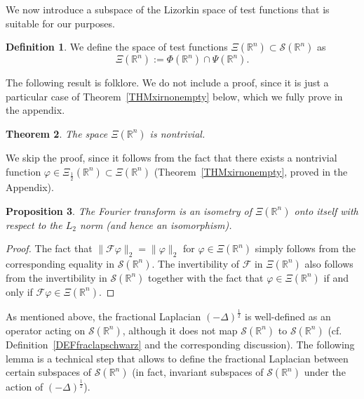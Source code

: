 \documentclass[reqno,11pt]{amsart}
\newtheorem{theorem}{Theorem}[section]
\newtheorem{proposition}[theorem]{Proposition}
\theoremstyle{definition}
\newtheorem{definition}[theorem]{Definition}
\def\R{\mathbb{R}}
\begin{document}
We now introduce a subspace of the Lizorkin space of test functions that is suitable for our purposes.
\begin{definition}
\label{space0}
	We define the space of test functions $\Xi(\R^n)\subset \mathcal{S}(\R^n)$ as \[
	\Xi(\R^n):=\Phi(\R^n)\cap \Psi(\R^n).
	\]
\end{definition}

The following result is folklore. We do not include a proof, since it is just a particular case of Theorem~\ref{THMxirnonempty} below, which we fully prove in the appendix.

\begin{theorem}
	The space $\Xi(\R^n)$ is nontrivial.
\end{theorem}
We skip the proof, since it follows from the fact that there exists a nontrivial function $\varphi\in \Xi_{\frac{1}{2}}(\R^n)\subset \Xi(\R^n)$ (Theorem~\ref{THMxirnonempty}, proved in the Appendix).



\begin{proposition}\label{PROPinvertibility}
	The Fourier transform is an isometry of $\Xi(\R^n)$ onto itself with respect to the $L_2$ norm (and hence an isomorphism).
\end{proposition}
\begin{proof}
	The fact that $\|\mathcal{F}\varphi\|_2=\|\varphi\|_2$ for $\varphi\in \Xi(\R^n)$ simply follows from the corresponding equality in $\mathcal{S}(\R^n)$. The invertibility of $\mathcal{F}$ in $\Xi(\R^n)$ also follows from the invertibility in $\mathcal{S}(\R^n)$ together with the fact that $\varphi\in \Xi(\R^n)$ if and only if $\mathcal{F}\varphi\in \Xi(\R^n)$.
\end{proof}




As mentioned above, the fractional Laplacian $(-\Delta)^\frac{1}{2}$ is well-defined as an operator acting on $\mathcal{S}(\R^n)$, although it does not map $\mathcal{S}(\R^n)$ to $\mathcal{S}(\R^n)$ (cf. Definition~\ref{DEFfraclapschwarz} and the corresponding discussion). The following lemma is a technical step that allows to define the fractional Laplacian between certain subspaces of $\mathcal{S}(\R^n)$ (in fact, invariant subspaces of $\mathcal{S}(\R^n)$ under the action of $(-\Delta)^\frac{1}{2}$).
\end{document}
